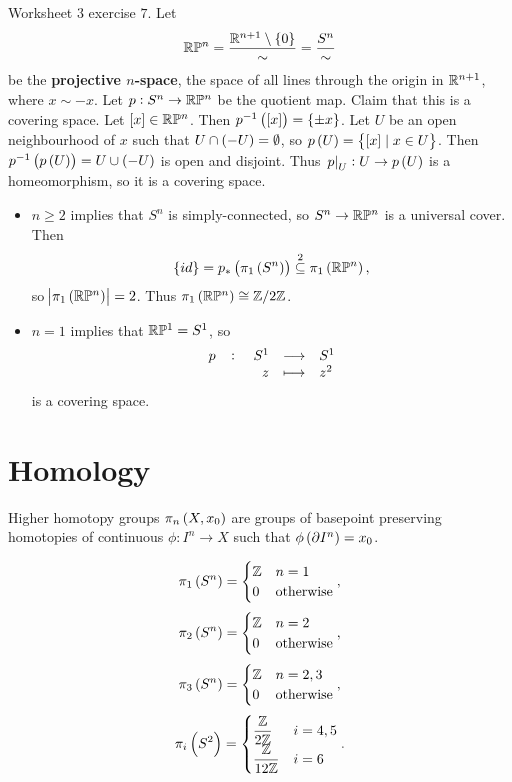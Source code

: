\begin{example*}
Worksheet $ 3 $ exercise $ 7 $. Let
$$ \R\P^n = \dfrac{\R^{n + 1} \setminus \cbr{0}}{\sim} = \dfrac{S^n}{\sim} $$
be the \textbf{projective $ n $-space}, the space of all lines through the origin in $ \mathbb{R}^{n + 1} $, where $ x \sim -x $. Let $ p : S^n \to \mathbb{R}\mathbb{P}^n $ be the quotient map. Claim that this is a covering space. Let $ \sbr{x} \in \R\P^n $. Then $ p^{-1}\br{\sbr{x}} = \cbr{\pm x} $. Let $ U $ be an open neighbourhood of $ x $ such that $ U \cap \br{-U} = \emptyset $, so $ p\br{U} = \cbr{\sbr{x} \mid x \in U} $. Then $ p^{-1}\br{p\br{U}} = U \cup \br{-U} $ is open and disjoint. Thus $ \eval{p}_U : U \to p\br{U} $ is a homeomorphism, so it is a covering space.
\begin{itemize}
\item $ n \ge 2 $ implies that $ S^n $ is simply-connected, so $ S^n \to \mathbb{R}\mathbb{P}^n $ is a universal cover. Then
$$ \cbr{id} = p_*\br{\pi_1\br{S^n}} \overset{2}{\subseteq} \pi_1\br{\R\P^n}, $$
so $ \abs{\pi_1\br{\R\P^n}} = 2 $. Thus $ \pi_1\br{\R\P^n} \cong \Z / 2\Z $.
\item $ n = 1 $ implies that $ \mathbb{R}\mathbb{P}^1 = S^1 $, so
$$ \function[p]{S^1}{S^1}{z}{z^2} $$
is a covering space.
\end{itemize}
\end{example*}

\pagebreak

\section{Homology}


Higher homotopy groups $ \pi_n\br{X, x_0} $ are groups of basepoint preserving homotopies of continuous $ \phi : I^n \to X $ such that $ \phi\br{\partial I^n} = x_0 $.

\begin{example*}
$$ \pi_1\br{S^n} =
\begin{cases}
\Z & n = 1 \\
0 & \text{otherwise}
\end{cases},
$$
$$ \pi_2\br{S^n} =
\begin{cases}
\Z & n = 2 \\
0 & \text{otherwise}
\end{cases},
$$
$$ \pi_3\br{S^n} =
\begin{cases}
\Z & n = 2, 3 \\
0 & \text{otherwise}
\end{cases},
$$
$$ \pi_i\br{S^2} =
\begin{cases}
\dfrac{\Z}{2\Z} & i = 4, 5 \\
\dfrac{\Z}{12\Z} & i = 6
\end{cases}.
$$
\end{example*}

